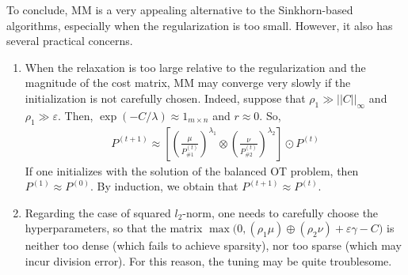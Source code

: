 To conclude, MM is a very appealing alternative to the Sinkhorn-based algorithms,
especially when the regularization is too small. However, it also has several practical concerns.
\begin{enumerate}
  \item When the relaxation is too large relative to the regularization and
  the magnitude of the cost matrix, MM may converge very slowly if the initialization is
  not carefully chosen. Indeed, suppose that $\rho_1 \gg ||C||_{\infty}$ and $\rho_1 \gg \varepsilon$.
  Then, $\exp(-C / \lambda) \approx 1_{m \times n}$ and $r \approx 0$. So,
  \begin{align}
    P^{(t+1)} \approx \left[ \left( \frac{\mu}{P^{(t)}_{\# 1}}\right)^{\lambda_1} \otimes
    \left( \frac{\nu}{P^{(t)}_{\# 2}}\right)^{\lambda_2} \right] \odot P^{(t)}
  \end{align}
  If one initializes with the solution of the balanced OT problem, then $P^{(1)} \approx P^{(0)}$.
  By induction, we obtain that $P^{(t+1)} \approx P^{(t)}$.

  \item Regarding the case of squared $l_2$-norm, one needs to carefully choose
  the hyperparameters, so that the matrix
  $\max \Big(0, (\rho_1 \mu) \oplus (\rho_2 \nu) + \varepsilon \gamma - C \Big)$ is
  neither too dense (which fails to achieve sparsity), nor too sparse (which may incur division error).
  For this reason, the tuning may be quite troublesome.
\end{enumerate}

